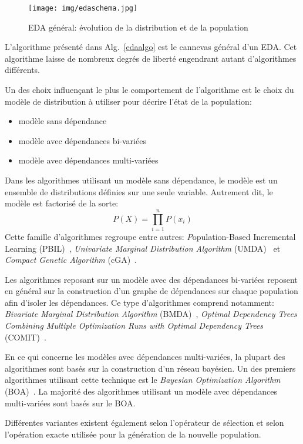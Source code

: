 \documentclass[a4paper, 12pt]{report}
\begin{document}
\begin{figure}[!tb]
\centering
\texttt{[image: img/edaschema.jpg]}
\caption{EDA général: évolution de la distribution et de la population~\cite{WIKI_EDA}}
\label{edaschema}
\end{figure}


L'algorithme présenté dans Alg.~\ref{edaalgo} est le cannevas général d'un EDA. Cet algorithme laisse de nombreux degrés de liberté engendrant autant d'algorithmes différents.

Un des choix influençant le plus le comportement de l'algorithme est le choix du modèle de distribution à utiliser pour décrire l'état de la population:
\begin{itemize}
\item modèle sans dépendance
\item modèle avec dépendances bi-variées
\item modèle avec dépendances multi-variées
\end{itemize}

Dans les algorithmes utilisant un modèle sans dépendance, le modèle est un ensemble de distributions définies sur une seule variable. Autrement dit, le modèle est factorisé de la sorte:
$$ P(X) = \prod_{i=1}^{n} P(x_i)$$
Cette famille d'algorithmes regroupe entre autres: \textit{P}opulation-{B}ased {I}ncremental {L}earning (PBIL)~\cite{PBIL}, \textit{Univariate Marginal Distribution Algorithm} (UMDA)~\cite{CLEVER_ALGO} et \textit{Compact Genetic Algorithm} (cGA)~\cite{CGA}.

Les algorithmes reposant sur un modèle avec des dépendances bi-variées reposent en général sur la construction d'un graphe de dépendances sur chaque population afin d'isoler les dépendances. Ce type d'algorithmes comprend notamment: \textit{Bivariate Marginal Distribution Algorithm} (BMDA)~\cite{BMDA}, \textit{Optimal Dependency Trees Combining Multiple Optimization Runs with Optimal Dependency Trees} (COMIT)~\cite{COMIT}.

En ce qui concerne les modèles avec dépendances multi-variées, la plupart des algorithmes sont basés sur la construction d'un réseau bayésien. Un des premiers algorithmes utilisant cette technique est le \textit{Bayesian Optimization Algorithm} (BOA)~\cite{BOA}. La majorité des algorithmes utilisant un modèle avec dépendances multi-variées sont basés sur le BOA.

Différentes variantes existent également selon l'opérateur de sélection et selon l'opération exacte utilisée pour la génération de la nouvelle population.
\end{document}
